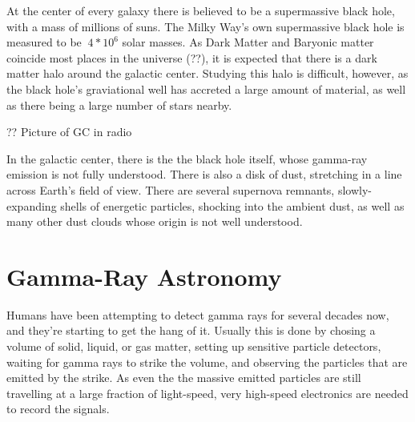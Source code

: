 At the center of every galaxy there is believed to be a supermassive black hole, with a mass of millions of suns.
The Milky Way's own supermassive black hole is measured to be $~4*10^6$ solar masses.
As Dark Matter and Baryonic matter coincide most places in the universe (??), it is expected that there is a dark matter halo around the galactic center.
Studying this halo is difficult, however, as the black hole's graviational well has accreted a large amount of material, as well as there being a large number of stars nearby.

?? Picture of GC in radio

In the galactic center, there is the the black hole itself, whose gamma-ray emission is not fully understood.
There is also a disk of dust, stretching in a line across Earth's field of view.
There are several supernova remnants, slowly-expanding shells of energetic particles, shocking into the ambient dust, as well as many other dust clouds whose origin is not well understood.


\section{Gamma-Ray Astronomy}
Humans have been attempting to detect gamma rays for several decades now, and they're starting to get the hang of it.
Usually this is done by chosing a volume of solid, liquid, or gas matter, setting up sensitive particle detectors, waiting for gamma rays to strike the volume, and observing the particles that are emitted by the strike.
As even the the massive emitted particles are still travelling at a large fraction of light-speed, very high-speed electronics are needed to record the signals.


